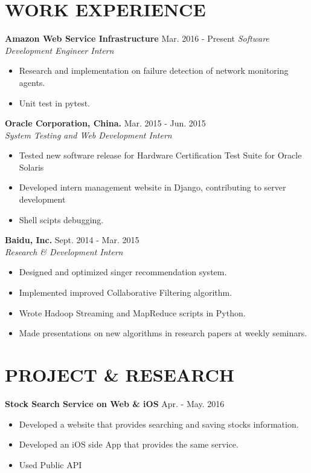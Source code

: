 \documentclass[margin,10pt]{res} %
\begin{document}
\begin{resume}
\section{WORK EXPERIENCE}
\leftmargini=4mm
{\bf Amazon Web Service Infrastructure} \hfill Mar. 2016 - Present 
\textit{Software Development Engineer Intern}
\begin{itemize}
\item Research and implementation on failure detection of network monitoring agents.
\item Unit test in pytest.
\end{itemize}

{\bf Oracle Corporation, China.} \hfill Mar. 2015 - Jun. 2015 \\
\textit{System Testing and Web Development Intern}
\begin{itemize}
\item Tested new software release for Hardware Certification Test Suite for Oracle Solaris
\item Developed intern management website in Django, contributing to server development
\item Shell scipts debugging.
\end{itemize}

{\bf Baidu, Inc.} \hfill Sept. 2014 - Mar. 2015 \\
\textit{Research \& Development Intern}
\begin{itemize}  %
\item Designed and optimized singer recommendation system.
\item Implemented improved Collaborative Filtering algorithm.
\item Wrote Hadoop Streaming and MapReduce scripts in Python. 
\item Made presentations on new algorithms in research papers at weekly seminars.
\end{itemize}

\section{PROJECT \& RESEARCH}
{\bf Stock Search Service on Web & iOS} \hfill Apr. - May. 2016\\
\begin{itemize}
\item Developed a website that provides searching and saving stocks information.
\item Developed an iOS side App that provides the same service.
\item Used Public API
\end{itemize}


\end{resume}
\end{document}
